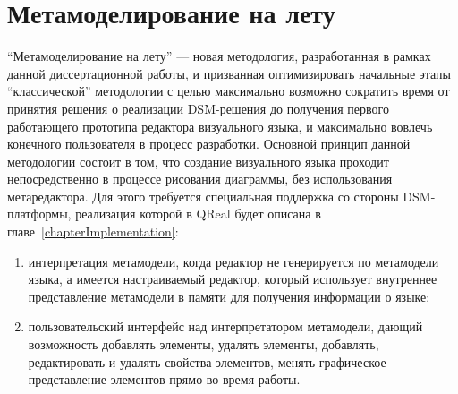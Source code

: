 \section{Метамоделирование на лету}
\label{chapterMetamodelingOnFly}
"`Метамоделирование на лету"' --- новая методология, разработанная в рамках данной 
диссертационной работы, и призванная оптимизировать начальные этапы "`классической"' 
методологии с целью максимально возможно сократить время от принятия решения о реализации 
DSM-решения до получения первого работающего прототипа редактора визуального языка, 
и максимально вовлечь конечного пользователя в процесс разработки. Основной принцип 
данной методологии состоит в том, что создание визуального языка проходит непосредственно 
в процессе рисования диаграммы, без использования метаредактора. Для этого требуется 
специальная поддержка со стороны DSM-платформы, реализация которой в QReal будет описана 
в главе~\ref{chapterImplementation}:
\begin{enumerate}
	\item интерпретация метамодели, когда редактор не генерируется по метамодели языка, 
		а имеется настраиваемый редактор, который использует внутреннее представление 
		метамодели в памяти для получения информации о языке;
	\item пользовательский интерфейс над интерпретатором метамодели, дающий возможность 
		добавлять элементы, удалять элементы, добавлять, редактировать и удалять свойства 
		элементов, менять графическое представление элементов прямо во время работы.
\end{enumerate}


